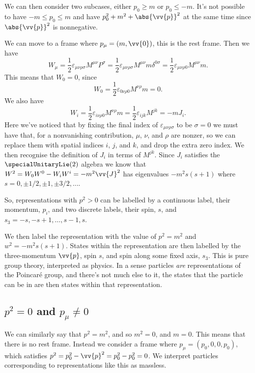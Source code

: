 \documentclass[fleqn]{NotesClass}
\begin{document}
    We can then consider two subcases, either \(p_0 \ge m\) or \(p_0 \le -m\).
    It's not possible to have \(-m \le p_0 \le m\) and have \(p_0^2 + m^2 + \abs{\vv{p}}^2\) at the same time since \(\abs{\vv{p}}^2\) is nonnegative.
    
    We can move to a frame where \(p_\mu = (m, \vv{0})\), this is the rest frame.
    Then we have
    \begin{equation}
        W_\mu = \frac{1}{2} \varepsilon_{\mu\nu\rho\sigma} M^{\mu\nu} P^\sigma = \frac{1}{2} \varepsilon_{\mu\nu\rho\sigma} M^{\mu\nu} m \delta^{0\sigma} = \frac{1}{2} \varepsilon_{\mu\nu\rho0} M^{\mu\nu}m.
    \end{equation}
    This means that \(W_0 = 0\), since
    \begin{equation}
        W_0 = \frac{1}{2}\varepsilon_{0\nu\rho0} M^{\nu\rho}m = 0.
    \end{equation}
    We also have
    \begin{equation}
        W_i = \frac{1}{2}\varepsilon_{i\nu\rho 0} M^{\nu\rho}m = \frac{1}{2}\varepsilon_{ijk} M^{jk} = -mJ_i.
    \end{equation}
    Here we've noticed that by fixing the final index of \(\varepsilon_{\mu\nu\rho\sigma}\) to be \(\sigma = 0\) we must have that, for a nonvanishing contribution, \(\mu\), \(\nu\), and \(\rho\) are nonzer, so we can replace them with spatial indices \(i\), \(j\), and \(k\), and drop the extra zero index.
    We then recognise the definition of \(J_i\) in terms of \(M^{jk}\).
    Since \(J_i\) satisfies the \(\specialUnitaryLie(2)\) algebra we know that \(W^2 = W_0W^0 - W_iW^i = -m^2\vv{J}^2\) has eigenvalues \(-m^2 s(s + 1)\) where \(s = 0, \pm 1/2, \pm 1, \pm 3/2, \dotsc\).
    
    So, representations with \(p^2 > 0\) can be labelled by a continuous label, their momentum, \(p_i\), and two discrete labels, their spin, \(s\), and \(s_3 = -s, -s + 1, \dotsc, s - 1, s\).
    
    We then label the representation with the value of \(p^2 = m^2\) and \(w^2 = -m^2s(s + 1)\).
    States within the representation are then labelled by the three-momentum \(\vv{p}\), spin \(s\), and spin along some fixed axis, \(s_3\).
    This is pure group theory, interpreted as physics.
    In a sense particles \emph{are} representations of the Poincar\'e group, and there's not much else to it, the states that the particle can be in are then states within that representation.
    
    \subsection{\texorpdfstring{\(p^2 = 0\) and \(p_\mu \ne 0\)}{p squared Zero and p mu Nonzero}}
    We can similarly say that \(p^2 = m^2\), and so \(m^2 = 0\), and \(m = 0\).
    This means that there is no rest frame.
    Instead we consider a frame where \(p_\mu = (p_0, 0, 0, p_0)\), which satisfies \(p^2 = p_0^2 - \vv{p}^2 = p_0^2 - p_0^2 = 0\).
    We interpret particles corresponding to representations like this as massless.
    
\end{document}

